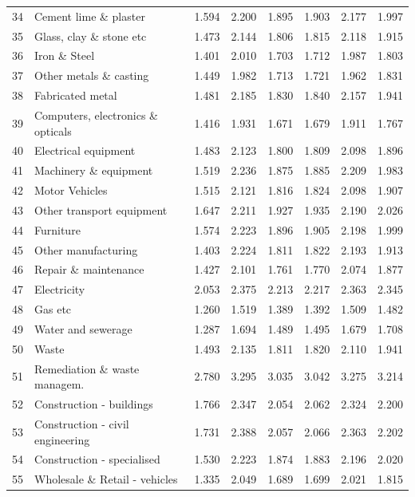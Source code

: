 \begin{longtable}{@{\extracolsep{\fill}}rlrrrrrr@{}}
    34    & Cement lime \& plaster & 1.594 & 2.200 & 1.895 & 1.903 & 2.177 & 1.997 \\
    35    & Glass, clay \& stone etc & 1.473 & 2.144 & 1.806 & 1.815 & 2.118 & 1.915 \\
    36    & Iron \& Steel & 1.401 & 2.010 & 1.703 & 1.712 & 1.987 & 1.803 \\
    37    & Other metals \& casting & 1.449 & 1.982 & 1.713 & 1.721 & 1.962 & 1.831 \\
    38    & Fabricated metal & 1.481 & 2.185 & 1.830 & 1.840 & 2.157 & 1.941 \\
    39    & Computers, electronics \& opticals & 1.416 & 1.931 & 1.671 & 1.679 & 1.911 & 1.767 \\
    40    & Electrical equipment & 1.483 & 2.123 & 1.800 & 1.809 & 2.098 & 1.896 \\
    41    & Machinery \& equipment & 1.519 & 2.236 & 1.875 & 1.885 & 2.209 & 1.983 \\
    42    & Motor Vehicles & 1.515 & 2.121 & 1.816 & 1.824 & 2.098 & 1.907 \\
    43    & Other transport equipment & 1.647 & 2.211 & 1.927 & 1.935 & 2.190 & 2.026 \\
    44    & Furniture & 1.574 & 2.223 & 1.896 & 1.905 & 2.198 & 1.999 \\
    45    & Other manufacturing & 1.403 & 2.224 & 1.811 & 1.822 & 2.193 & 1.913 \\
    46    & Repair \& maintenance & 1.427 & 2.101 & 1.761 & 1.770 & 2.074 & 1.877 \\
    47    & Electricity & 2.053 & 2.375 & 2.213 & 2.217 & 2.363 & 2.345 \\
    48    & Gas etc & 1.260 & 1.519 & 1.389 & 1.392 & 1.509 & 1.482 \\
    49    & Water and sewerage & 1.287 & 1.694 & 1.489 & 1.495 & 1.679 & 1.708 \\
    50    & Waste & 1.493 & 2.135 & 1.811 & 1.820 & 2.110 & 1.941 \\
    51    & Remediation \& waste managem. & 2.780 & 3.295 & 3.035 & 3.042 & 3.275 & 3.214 \\
    52    & Construction - buildings & 1.766 & 2.347 & 2.054 & 2.062 & 2.324 & 2.200 \\
    53    & Construction - civil engineering & 1.731 & 2.388 & 2.057 & 2.066 & 2.363 & 2.202 \\
    54    & Construction - specialised & 1.530 & 2.223 & 1.874 & 1.883 & 2.196 & 2.020 \\
    55    & Wholesale \& Retail - vehicles & 1.335 & 2.049 & 1.689 & 1.699 & 2.021 & 1.815 \\

\end{longtable}
